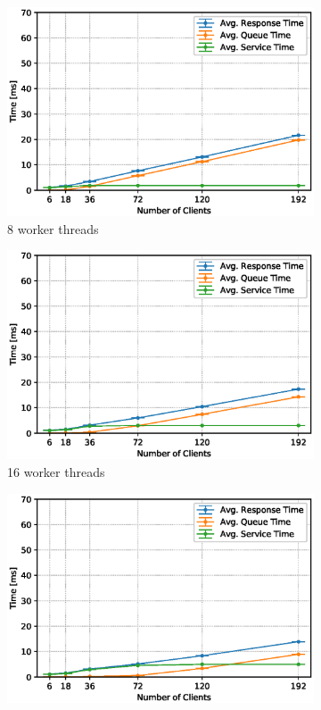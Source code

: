 \documentclass[11pt,a4paper]{article}
\begin{document}
\begin{figure}
    \begin{subfigure}{.5\textwidth}
        \includegraphics[width=1\linewidth]{plots/3_2b_extendedLatencyMiddleware_8w.eps}
        \caption{8 worker threads}
    \end{subfigure}
    \begin{subfigure}{.5\textwidth}
        \includegraphics[width=1\linewidth]{plots/3_2b_extendedLatencyMiddleware_16w.eps}
        \caption{16 worker threads}
    \end{subfigure}
    \begin{subfigure}{.5\textwidth}
        \includegraphics[width=1\linewidth]{plots/3_2b_extendedLatencyMiddleware_32w.eps}

\end{subfigure}
\end{figure}
\end{document}

